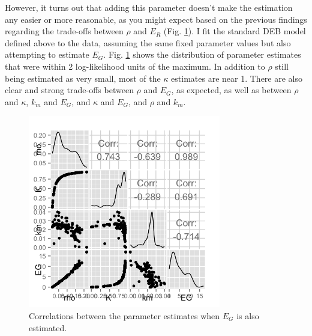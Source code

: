 \documentclass[12pt,reqno,final,pdftex]{amsart}\usepackage[]{graphicx}\usepackage[]{color}
\newenvironment{knitrout}{}{} %
\theoremstyle{plain}
\numberwithin{equation}{part}
\begin{document}
However, it turns out that adding this parameter doesn't make the estimation any easier or more reasonable, as you might expect based on the previous findings regarding the trade-offs between $\rho$ and $E_R$ (Fig. \ref{fig:with-EG-scatter}).
I fit the standard DEB model defined above to the data, assuming the same fixed parameter values but also attempting to estimate $E_G$.
Fig. \ref{fig:with-EG-scatter} shows the distribution of parameter estimates that were within 2 log-likelihood units of the maximum.
In addition to $\rho$ still being estimated as very small, most of the $\kappa$ estimates are near 1.
There are also clear and strong trade-offs between $\rho$ and $E_G$, as expected, as well as between $\rho$ and $\kappa$, $k_m$ and $E_G$, and $\kappa$ and $E_G$, and $\rho$ and $k_m$.
\begin{knitrout}\scriptsize
{}\color{fgcolor}\begin{figure}

\includegraphics[width=0.75\textwidth]{figure/with-EG-scatter-1} \hfill{}

\caption[Correlations between the parameter estimates when ]{Correlations between the parameter estimates when $E_G$ is also estimated.}\label{fig:with-EG-scatter}
\end{figure}


\end{knitrout}
\end{document}
